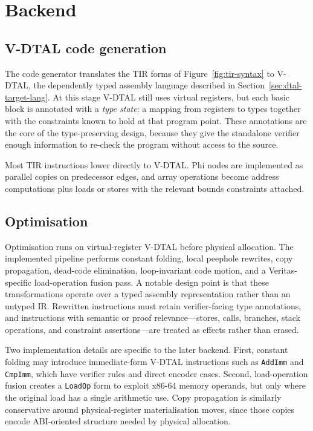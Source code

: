 \section{Backend}\label{sec:backend}

\subsection{V-DTAL code generation}

The code generator translates the TIR forms of Figure~\ref{fig:tir-syntax} to V-DTAL, the dependently typed assembly language described in Section~\ref{sec:dtal-target-lang}. At this stage V-DTAL still uses virtual registers, but each basic block is annotated with a \textit{type state}: a mapping from registers to types together with the constraints known to hold at that program point. These annotations are the core of the type-preserving design, because they give the standalone verifier enough information to re-check the program without access to the source.

Most TIR instructions lower directly to V-DTAL. Phi nodes are implemented as parallel copies on predecessor edges, and array operations become address computations plus loads or stores with the relevant bounds constraints attached.

\subsection{Optimisation}

Optimisation runs on virtual-register V-DTAL before physical allocation. The implemented pipeline performs constant folding, local peephole rewrites, copy propagation, dead-code elimination, loop-invariant code motion, and a Veritas-specific load-operation fusion pass. A notable design point is that these transformations operate over a typed assembly representation rather than an untyped IR. Rewritten instructions must retain verifier-facing type annotations, and instructions with semantic or proof relevance---stores, calls, branches, stack operations, and constraint assertions---are treated as effects rather than erased.

Two implementation details are specific to the later backend. First, constant folding may introduce immediate-form V-DTAL instructions such as \texttt{AddImm} and \texttt{CmpImm}, which have verifier rules and direct encoder cases. Second, load-operation fusion creates a \texttt{LoadOp} form to exploit x86-64 memory operands, but only where the original load has a single arithmetic use. Copy propagation is similarly conservative around physical-register materialisation moves, since those copies encode ABI-oriented structure needed by physical allocation.

